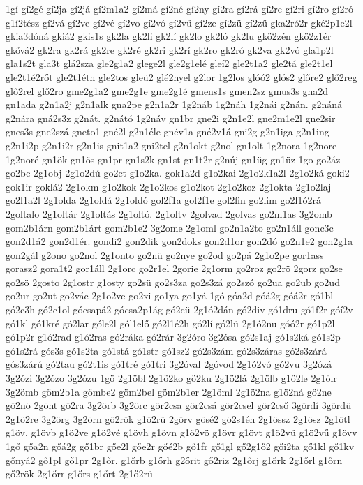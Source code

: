 {1gí
gí2gé
gí2ja
gí2já
gí2m1a2
gí2má
gí2né
gí2ny
gí2ra
gí2rá
gí2re
gí2ri
gí2ro
gí2ró
g1í2tész
gí2vá
gí2ve
gí2vé
gí2vo
gí2vó
gí2vü
gí2ze
gí2zü
gí2zű
gka2ró2r
gké2p1e2l
gkia3dóná
gkiá2
gkis1s
gk2la
gk2li
gk2lí
gk2lo
gk2ló
gk2lu
gkö2zén
gkö2z1ér
gkővá2
gk2ra
gk2rá
gk2re
gk2ré
gk2ri
gk2rí
gk2ro
gk2ró
gk2va
gk2vó
gla1p2l
gla1s2t
gla3t
glá2sza
gle2g1a2
glege2l
gle2g1elé
gleí2
gle2t1a2
gle2tá
gle2t1el
gle2t1é2rőt
gle2t1étn
gle2tos
gleü2
glé2nyel
g2lor
1g2los
glóó2
glós2
glőre2
glő2reg
glő2rel
glő2ro
gme2g1a2
gme2g1e
gme2g1é
gmens1s
gmen2sz
gmus3s
gna2d
gn1ada
g2n1a2j
g2n1alk
gna2pe
g2n1a2r
1g2náb
1g2náh
1g2nái
g2nán.
g2náná
g2nára
gná2s3z
g2nát.
g2nátó
1g2náv
gn1br
gne2i
g2n1e2l
gne2m1e2l
gne2sir
gnes3s
gne2szá
gneto1
gné2l
g2n1éle
gnév1a
gné2v1á
gni2g
g2n1iga
g2n1ing
g2n1i2p
g2n1i2r
g2n1is
gnit1a2
gni2tel
g2n1okt
g2nol
gn1olt
1g2nora
1g2nore
1g2noré
gn1ök
gn1ös
gn1pr
gn1s2k
gn1st
gn1t2r
g2núj
gn1üg
gn1üz
1go
go2áz
go2be
2g1obj
2g1o2dú
go2et
g1o2ka.
gok1a2d
g1o2kai
2g1o2k1a2l
2g1o2ká
goki2
gok1ir
goklá2
2g1okm
g1o2kok
2g1o2kos
g1o2kot
2g1o2koz
2g1okta
2g1o2laj
go2l1a2l
2g1olda
2g1oldá
2g1oldó
gol2f1a
gol2f1e
gol2fin
go2lim
go2l1ó2rá
2goltalo
2g1oltár
2g1oltás
2g1oltó.
2g1oltv
2golvad
2golvas
go2m1as
3g2omb
gom2b1árn
gom2b1árt
gom2b1e2
3g2ome
2g1oml
go2n1a2to
go2n1áll
gonc3c
gon2d1á2
gon2d1ér.
gondi2
gon2dik
gon2doks
gon2d1or
gon2dó
go2n1e2
gon2g1a
gon2gál
g2ono
go2nol
2g1onto
go2nü
go2nye
go2od
go2pá
2g1o2pe
gor1ass
gorasz2
gora1t2
gor1áll
2g1orc
go2r1el
2gorie
2g1orm
go2roz
go2rö
2gorz
go2se
go2sö
2gosto
2g1ostr
g1osty
go2sü
go2s3za
go2s3zá
go2szó
go2ua
go2ub
go2ud
go2ur
go2ut
go2vác
2g1o2ve
go2xi
go1ya
go1yá
1gó
góa2d
góá2g
góá2r
gó1bl
gó2c3h
gó2c1ol
gócsapá2
gócsa2p1ág
gó2cü
2g1ó2dán
gó2div
gó1dru
gó1f2r
góí2v
gó1kl
gó1kré
gó2lar
góle2l
gól1elő
gó2l1é2h
gó2lí
gó2lü
2g1ó2nu
góó2r
gó1p2l
gó1p2r
g1ó2rad
g1ó2ras
gó2ráka
gó2rár
3g2óro
3g2ósa
gó2s1aj
gó1s2ká
gó1s2p
gó1s2rá
gós3s
gó1s2ta
gó1stá
gó1str
gó1sz2
gó2s3zám
gó2s3záras
gó2s3zárá
gós3zárú
gó2tau
gó2t1is
gó1tré
gó1tri
3g2óval
2góvod
2g1ó2vó
gó2vu
3g2ózá
3g2ózi
3g2ózo
3g2ózu
1gö
2g1öbl
2g1ö2ko
gö2ku
2g1ö2lá
2g1ölb
g1ö2le
2g1ölr
3g2ömb
göm2b1a
gömbe2
göm2bel
göm2b1er
2g1öml
2g1ö2na
g1ö2ná
gö2ne
gö2nö
2gönt
gö2ra
3g2örb
3g2örc
gör2csa
gör2csá
gör2csel
gör2cső
3gördí
3gördü
2g1ö2re
3g2örg
3g2örn
gö2rök
g1ö2rü
2görv
gösé2
gö2s1én
2g1össz
2g1ösz
2g1ötl
g1öv.
g1övb
g1ö2ve
g1ö2vé
g1övh
g1övn
g1ö2vö
g1övr
g1övt
g1ö2vü
g1ö2vű
g1övv
1gő
gőa2n
gőá2g
gő1br
gőe2l
gőe2r
gőé2b
gő1fr
gő1gl
gő2g1ő2
gői2ta
gő1kl
gő1kv
gőnyá2
gő1pl
gő1pr
2g1őr.
g1őrb
g1őrh
g2őrit
gő2riz
2g1őrj
g1őrk
2g1őrl
g1őrn
gő2rök
2g1őrr
g1őrs
g1őrt
2g1ő2rü
}
